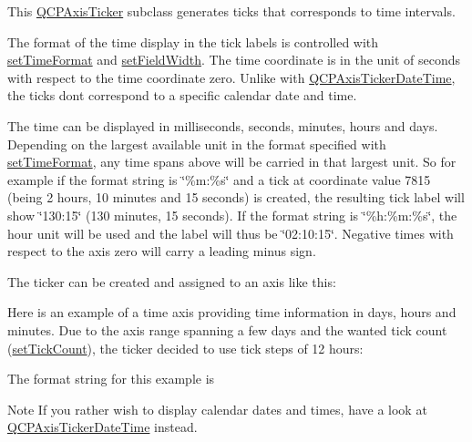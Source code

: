 This \hyperlink{class_q_c_p_axis_ticker}{Q\+C\+P\+Axis\+Ticker} subclass generates ticks that corresponds to time intervals.

The format of the time display in the tick labels is controlled with \hyperlink{class_q_c_p_axis_ticker_time_a2f30b6e5125bce4256be9ce3177088ea}{set\+Time\+Format} and \hyperlink{class_q_c_p_axis_ticker_time_adc13e54fc969be98a5c0e3fa0dbaa293}{set\+Field\+Width}. The time coordinate is in the unit of seconds with respect to the time coordinate zero. Unlike with \hyperlink{class_q_c_p_axis_ticker_date_time}{Q\+C\+P\+Axis\+Ticker\+Date\+Time}, the ticks don\textquotesingle{}t correspond to a specific calendar date and time.

The time can be displayed in milliseconds, seconds, minutes, hours and days. Depending on the largest available unit in the format specified with \hyperlink{class_q_c_p_axis_ticker_time_a2f30b6e5125bce4256be9ce3177088ea}{set\+Time\+Format}, any time spans above will be carried in that largest unit. So for example if the format string is \char`\"{}\%m\+:\%s\char`\"{} and a tick at coordinate value 7815 (being 2 hours, 10 minutes and 15 seconds) is created, the resulting tick label will show \char`\"{}130\+:15\char`\"{} (130 minutes, 15 seconds). If the format string is \char`\"{}\%h\+:\%m\+:\%s\char`\"{}, the hour unit will be used and the label will thus be \char`\"{}02\+:10\+:15\char`\"{}. Negative times with respect to the axis zero will carry a leading minus sign.

The ticker can be created and assigned to an axis like this\+: 
\begin{DoxyCodeInclude}
\end{DoxyCodeInclude}
 Here is an example of a time axis providing time information in days, hours and minutes. Due to the axis range spanning a few days and the wanted tick count (\hyperlink{class_q_c_p_axis_ticker_a47752abba8293e6dc18491501ae34008}{set\+Tick\+Count}), the ticker decided to use tick steps of 12 hours\+:



The format string for this example is 
\begin{DoxyCodeInclude}
\end{DoxyCodeInclude}
 \begin{DoxyNote}{Note}
If you rather wish to display calendar dates and times, have a look at \hyperlink{class_q_c_p_axis_ticker_date_time}{Q\+C\+P\+Axis\+Ticker\+Date\+Time} instead. 
\end{DoxyNote}


